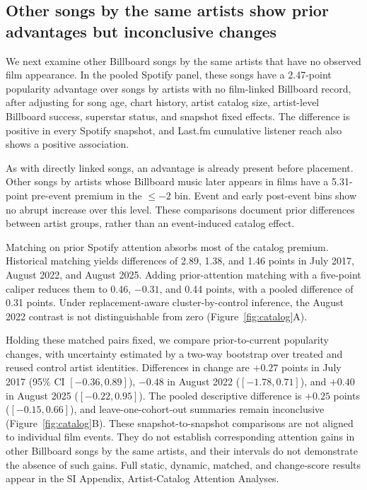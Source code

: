 \documentclass[10pt]{article}
\begin{document}
\subsection*{Other songs by the same artists show prior advantages but inconclusive changes}

We next examine other Billboard songs by the same artists that have no observed film appearance. In the pooled Spotify panel, these songs have a 2.47-point popularity advantage over songs by artists with no film-linked Billboard record, after adjusting for song age, chart history, artist catalog size, artist-level Billboard success, superstar status, and snapshot fixed effects. The difference is positive in every Spotify snapshot, and Last.fm cumulative listener reach also shows a positive association.

As with directly linked songs, an advantage is already present before placement. Other songs by artists whose Billboard music later appears in films have a 5.31-point pre-event premium in the $\leq -2$ bin. Event and early post-event bins show no abrupt increase over this level. These comparisons document prior differences between artist groups, rather than an event-induced catalog effect.

Matching on prior Spotify attention absorbs most of the catalog premium. Historical matching yields differences of 2.89, 1.38, and 1.46 points in July 2017, August 2022, and August 2025. Adding prior-attention matching with a five-point caliper reduces them to 0.46, $-0.31$, and 0.44 points, with a pooled difference of 0.31 points. Under replacement-aware cluster-by-control inference, the August 2022 contrast is not distinguishable from zero (Figure~\ref{fig:catalog}A).

Holding these matched pairs fixed, we compare prior-to-current popularity changes, with uncertainty estimated by a two-way bootstrap over treated and reused control artist identities. Differences in change are $+0.27$ points in July 2017 (95\% CI $[-0.36, 0.89]$), $-0.48$ in August 2022 ($[-1.78, 0.71]$), and $+0.40$ in August 2025 ($[-0.22, 0.95]$). The pooled descriptive difference is $+0.25$ points ($[-0.15, 0.66]$), and leave-one-cohort-out summaries remain inconclusive (Figure~\ref{fig:catalog}B). These snapshot-to-snapshot comparisons are not aligned to individual film events. They do not establish corresponding attention gains in other Billboard songs by the same artists, and their intervals do not demonstrate the absence of such gains. Full static, dynamic, matched, and change-score results appear in the SI Appendix, Artist-Catalog Attention Analyses.
\end{document}
